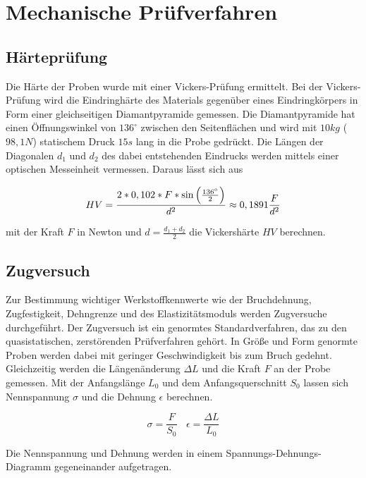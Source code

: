 \section{Mechanische Prüfverfahren}

\subsection{Härteprüfung}

Die Härte der Proben wurde mit einer Vickers-Prüfung ermittelt. Bei der Vickers-Prüfung wird die Eindringhärte des Materials gegenüber eines Eindringkörpers in Form einer gleichseitigen Diamantpyramide gemessen. Die Diamantpyramide hat einen Öffnungswinkel von $136^\circ$ zwischen den Seitenflächen und wird mit $10 kg$ ($98,1 N$) statischem Druck $15 s$ lang in die Probe gedrückt. Die Längen der Diagonalen $d_1$ und $d_2$ des dabei entstehenden Eindrucks werden mittels einer optischen Messeinheit vermessen. Daraus lässt sich aus

\begin{equation}
\centering
HV=\frac {2*0,102*F*\sin \left( \frac{136^\circ}{2}\right) } {d^2} \approx 0,1891 \frac{F}{d^2}
	\label{eq:HV}
\end{equation}

mit der Kraft $F$ in Newton und $d=\frac {d_1 + d_2}{2} $ die Vickershärte $HV$ berechnen. 

\subsection{Zugversuch}
Zur Bestimmung wichtiger Werkstoffkennwerte wie der Bruchdehnung, Zugfestigkeit, Dehngrenze und des Elastizitätsmoduls werden Zugversuche durchgeführt. Der Zugversuch ist ein genormtes Standardverfahren, das zu den quasistatischen, zerstörenden Prüfverfahren gehört. In Größe und Form genormte Proben werden dabei mit geringer Geschwindigkeit bis zum Bruch gedehnt. Gleichzeitig werden die Längenänderung $\Delta L$ und die Kraft $F$ an der Probe gemessen. Mit der Anfangslänge $L_0$ und dem Anfangsquerschnitt $S_0$ lassen sich Nennspannung $\sigma$ und die Dehnung $\epsilon$ berechnen.

\begin{equation}

	\sigma=\frac{F}{S_0} ~~~~
	\epsilon=\frac{\Delta L} {L_0}
\end{equation}

Die Nennspannung und Dehnung werden in einem Spannungs-Dehnungs-Diagramm gegeneinander aufgetragen. 